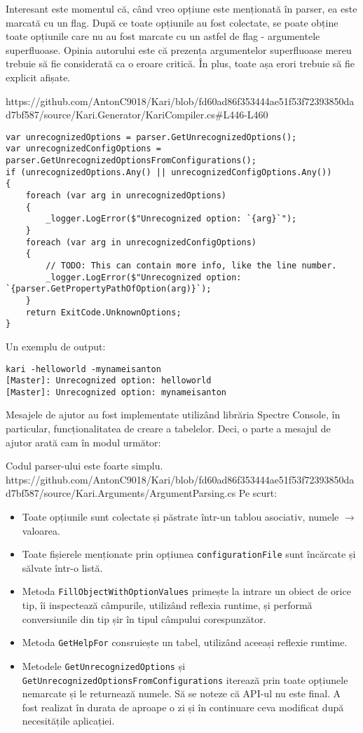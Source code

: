 \documentclass[a4paper,12pt]{report}
\begin{document}
Interesant este momentul că, când vreo opțiune este menționată în parser, ea este marcată cu un flag.
După ce toate opțiunile au fost colectate, se poate obține toate opțiunile care nu au fost marcate cu un astfel de flag - argumentele superfluoase.
Opinia autorului este că prezența argumentelor superfluoase mereu trebuie să fie considerată ca o eroare critică.
În plus, toate așa erori trebuie să fie explicit afișate.

https://github.com/AntonC9018/Kari/blob/fd60ad86f353444ae51f53f72393850dad7bf587/source/Kari.Generator/KariCompiler.cs#L446-L460

\begin{verbatim}
var unrecognizedOptions = parser.GetUnrecognizedOptions();
var unrecognizedConfigOptions = parser.GetUnrecognizedOptionsFromConfigurations();
if (unrecognizedOptions.Any() || unrecognizedConfigOptions.Any())
{
    foreach (var arg in unrecognizedOptions)
    {
        _logger.LogError($"Unrecognized option: `{arg}`");
    }
    foreach (var arg in unrecognizedConfigOptions)
    {
        // TODO: This can contain more info, like the line number.
        _logger.LogError($"Unrecognized option: `{parser.GetPropertyPathOfOption(arg)}`);
    }
    return ExitCode.UnknownOptions;
}
\end{verbatim}

Un exemplu de output:

\begin{verbatim}
kari -helloworld -mynameisanton
[Master]: Unrecognized option: helloworld
[Master]: Unrecognized option: mynameisanton
\end{verbatim}


Mesajele de ajutor au fost implementate utilizând librăria Spectre Console\cite{spectre_console_github}, în particular, funcționalitatea de creare a tabelelor.
Deci, o parte a mesajul de ajutor arată cam în modul următor:

Codul parser-ului este foarte simplu.
https://github.com/AntonC9018/Kari/blob/fd60ad86f353444ae51f53f72393850dad7bf587/source/Kari.Arguments/ArgumentParsing.cs
Pe scurt:

\begin{itemize}
  \item Toate opțiunile sunt colectate și păstrate într-un tablou asociativ, numele $\rightarrow$ valoarea.
  \item Toate fișierele menționate prin opțiunea \texttt{configurationFile} sunt încărcate și sălvate într-o listă.
  \item Metoda \texttt{FillObjectWithOptionValues} primește la intrare un obiect de orice tip, îi inspectează câmpurile, utilizând reflexia runtime, și performă conversiunile din tip șir în tipul câmpului corespunzător.
  \item Metoda \texttt{GetHelpFor} consruiește un tabel, utilizând aceeași reflexie runtime.
  \item Metodele \texttt{GetUnrecognizedOptions} și \texttt{GetUnrecognizedOptionsFromConfigurations} iterează prin toate opțiunele nemarcate și le returnează numele.
  Să se noteze că API-ul nu este final.
  A fost realizat în durata de aproape o zi și în continuare ceva modificat după necesitățile aplicației.
\end{itemize}
\end{document}
